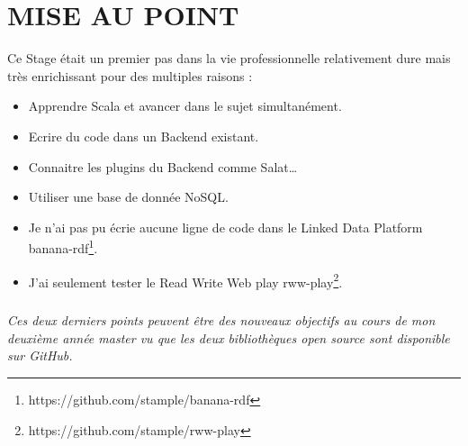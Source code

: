 \chapter{MISE AU POINT}

Ce Stage était un premier pas dans la vie professionnelle relativement dure mais très enrichissant pour des multiples raisons :
\begin{itemize}
\item Apprendre Scala et avancer dans le sujet simultanément.

\item Ecrire du code dans un Backend existant.

\item Connaitre les plugins du Backend comme Salat…

\item Utiliser une base de donnée NoSQL.

\item Je n'ai pas pu écrie aucune ligne de code dans le Linked Data Platform banana-rdf\footnote{https://github.com/stample/banana-rdf}.

\item J'ai seulement tester le Read Write Web play rww-play\footnote{https://github.com/stample/rww-play}.


\end{itemize}
\paragraph{}
\textit{
Ces deux derniers points peuvent être des nouveaux objectifs au cours de mon deuxième année master vu que les deux bibliothèques open source sont disponible sur GitHub.}  
